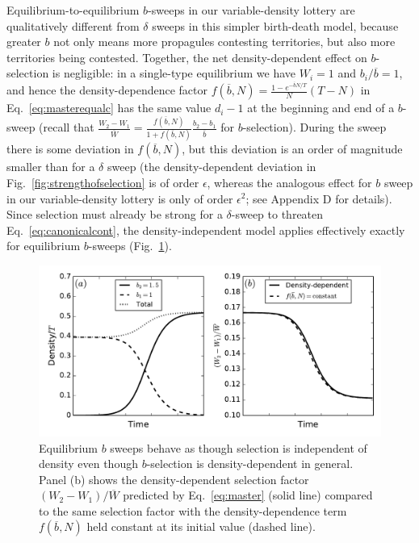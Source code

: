 \documentclass[12pt]{article}
\begin{document}
Equilibrium-to-equilibrium $b$-sweeps in our variable-density lottery are qualitatively different from $\delta$ sweeps in this simpler birth-death model, because greater $b$ not only means more propagules contesting territories, but also more territories being contested. Together, the net density-dependent effect on $b$-selection is negligible: in a single-type equilibrium we have $W_i=1$ and $b_i/\overline{b}=1$, and hence the density-dependence factor $f(\overline{b},N)=\frac{1-e^{-\overline{b}N/T}}{N}(T-N)$ in Eq.~\eqref{eq:masterequalc} has the same value $d_i-1$ at the beginning and end of a $b$-sweep (recall that $\frac{W_2-W_1}{\overline{W}}=\frac{f(\overline{b},N)}{1+f(\overline{b},N)}\frac{b_2-b_1}{\overline{b}}$ for $b$-selection). During the sweep there is some deviation in $f(\overline{b},N)$, but this deviation is an order of magnitude smaller than for a $\delta$ sweep (the density-dependent deviation in Fig.~\ref{fig:strengthofselection} is of order $\epsilon$, whereas the analogous effect for $b$ sweep in our variable-density lottery is only of order $\epsilon^2$; see Appendix D for details). Since selection must already be strong for a $\delta$-sweep to threaten Eq.~\eqref{eq:canonicalcont}, the density-independent model applies effectively exactly for equilibrium $b$-sweeps (Fig.~\ref{fig:bsweep}).

\begin{figure}
\centering
\includegraphics[scale=0.8]{bsweep.pdf}
\caption{\label{fig:bsweep} Equilibrium $b$ sweeps behave as though selection is independent of density even though $b$-selection is density-dependent in general. Panel (b) shows the density-dependent selection factor $(W_2-W_1)/\overline{W}$ predicted by Eq.~\eqref{eq:master} (solid line) compared to the same selection factor with the density-dependence term $f(\overline{b},N)$ held constant at its initial value (dashed line).}
\end{figure}
\end{document}
